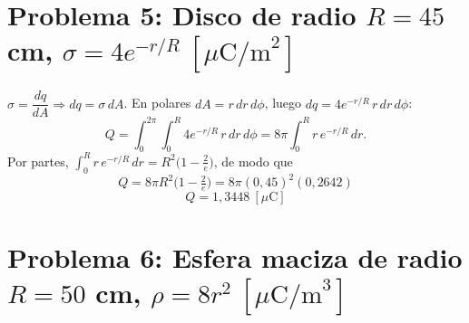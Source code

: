 \documentclass[12pt,letterpaper]{article}
\begin{document}
\vspace{0.4cm}
\section*{Problema 5: Disco de radio $R=45$ cm, $\sigma=4e^{-r/R}\ [\mu\text{C/m}^2]$}

\noindent
\begin{minipage}[t]{0.30\textwidth}
\centering\vspace{2pt}
\end{minipage}%
\hfill
\begin{minipage}[t]{0.66\textwidth}
\vspace{0pt}
$\sigma=\dfrac{dq}{dA}\Rightarrow dq=\sigma\,dA$. En polares $dA=r\,dr\,d\phi$, luego
$dq=4e^{-r/R}\,r\,dr\,d\phi$:
\[
    Q = \int_0^{2\pi}\!\!\int_0^{R} 4e^{-r/R}\,r\,dr\,d\phi
      = 8\pi\int_0^{R} r\,e^{-r/R}\,dr.
\]
Por partes, $\displaystyle\int_0^{R} r\,e^{-r/R}\,dr = R^{2}\Big(1-\tfrac{2}{e}\Big)$, de modo que
\[
    Q = 8\pi R^{2}\Big(1-\tfrac{2}{e}\Big) = 8\pi(0{,}45)^{2}(0{,}2642)
\]
\[
    \boxed{Q = 1{,}3448\ [\mu\text{C}]}
\]
\end{minipage}

\vspace{0.4cm}
\section*{Problema 6: Esfera maciza de radio $R=50$ cm, $\rho=8r^{2}\ [\mu\text{C/m}^3]$}
\end{document}
